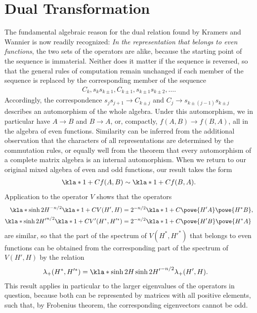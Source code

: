 \documentclass[english, parskip=full]{scrartcl}
\begin{document}
\section{Dual Transformation}
The fundamental algebraic reason for the dual relation found by Kramers and Wannier is now readily recognized: \emph{In the representation that belongs to even functions}, the two sets of the operators are alike, because the starting point of the sequence is immaterial.
Neither does it matter if the sequence is reversed, so that the general rules of computation remain unchanged if each member of the sequence is replaced by the corresponding member of the sequence
\begin{align}
C_k, s_ks_{k\pm 1}, C_{k\pm 1}, s_{k\pm 1} s_{k\pm 2}, \dots.
\end{align}
Accordingly, the correspondence $s_js_{j+1} \rightarrow C_{k\pm j}$ and $C_j\rightarrow s_{k\pm (j-1)}s_{k\pm j}$ describes an automorphism of the whole algebra.
Under this automorphism, we in particular have $A\rightarrow B$ and $B\rightarrow A$, or, compactly, $f(A,B)\rightarrow f(B,A)$, all in the algebra of even functions.
Similarity can be inferred from the additional observation that the characters of all representations are determined by the commutation rules, or equally well from the theorem that every automorphism of a complete matrix algebra is an internal automorphism.
When we return to our original mixed algebra of even and odd functions, our result takes the form
\begin{align}
\kla*{1+C}f(A,B) \sim \kla*{1+C}f(B,A).
\end{align}
Application to the operator $V$ shows that the operators
\begin{align}
\kla*{\sinh 2H}^{-n/2} \kla*{1+C} V(H',H) &= 2^{-n/2} \kla*{1+C} \powe{H'A} \powe{H^\ast B},\\
\kla*{\sinh 2H'}^{n/2} \kla*{1+C} V'(H^\ast, H'^\ast) &= 2^{-n/2} \kla*{1+C} \powe{H'B} \powe{H^\ast A}
\end{align}
are similar, so that the part of the spectrum of $V(H^\ast, H'^\ast)$ that belongs to even functions can be obtained from the corresponding part of the spectrum of $V(H',H)$ by the relation
\begin{align}
\lambda_+(H^\ast, H'^\ast) &= \kla*{\sinh 2H \sinh 2H'}^{-n/2} \lambda_+(H',H).
\end{align}
This result applies in particular to the larger eigenvalues of the operators in question, because both can be represented by matrices with all positive elements, such that, by Frobenius theorem, the corresponding eigenvectors cannot be odd.
\end{document}
